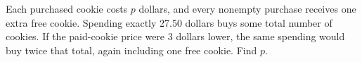 Each purchased cookie costs $p$ dollars, and every nonempty purchase receives one extra free cookie. Spending exactly 27.50 dollars buys some total number of cookies. If the paid-cookie price were 3 dollars lower, the same spending would buy twice that total, again including one free cookie. Find $p$.
